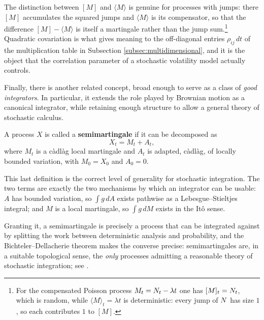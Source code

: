 The distinction between $[M]$ and $\langle M\rangle$ is genuine for processes with jumps: there
$[M]$ accumulates the squared jumps and $\langle M\rangle$ is its compensator, so that the
difference $[M]-\langle M\rangle$ is itself a martingale rather than the jump sum.\footnote{For the compensated Poisson process
$M_t = N_t - \lambda t$ one has $[M]_t = N_t$, which is random, while $\langle M\rangle_t = \lambda t$
is deterministic: every jump of $N$ has size $1$, so each contributes $1$ to $[M]$.}  Quadratic covariation is what gives
meaning to the off-diagonal entries $\rho_{ij}\,dt$ of the multiplication table in Subsection 
\ref{subsec:multidimensional}, and it is the object that the correlation parameter of a stochastic 
volatility model actually controls.

\noindent
Finally, there is another related concept, broad enough to serve as a class of \textit{good integrators}. In particular, it extends the role played by Brownian motion as a canonical integrator, while retaining enough structure to allow a general theory of stochastic calculus.

\begin{definition}[Semimartingale]\label{def:semimartingale}
A process $X$ is called a \textbf{semimartingale} if it can be decomposed as
\[
X_t = M_t + A_t,
\]
where $M_t$ is a càdlàg local martingale and $A_t$ is adapted, càdlàg, of locally bounded variation, with $M_0 = X_0$ and $A_0 = 0$.
\end{definition}

This last definition is the correct level of generality for stochastic integration. The two terms are exactly the 
two mechanisms by which an integrator can be usable: $A$ has bounded variation, so 
$\int g\,dA$ exists pathwise as a Lebesgue--Stieltjes integral; and $M$ is a 
local martingale, so $\int g\,dM$ exists in the Itô sense. 

Granting it, a semimartingale is precisely a process that can be integrated against by splitting the 
work between deterministic analysis and probability, and the Bichteler--Dellacherie theorem makes 
the converse precise: semimartingales are, in a suitable topological sense, the \emph{only} 
processes admitting a reasonable theory of stochastic integration; see \cite{protter2005}.

